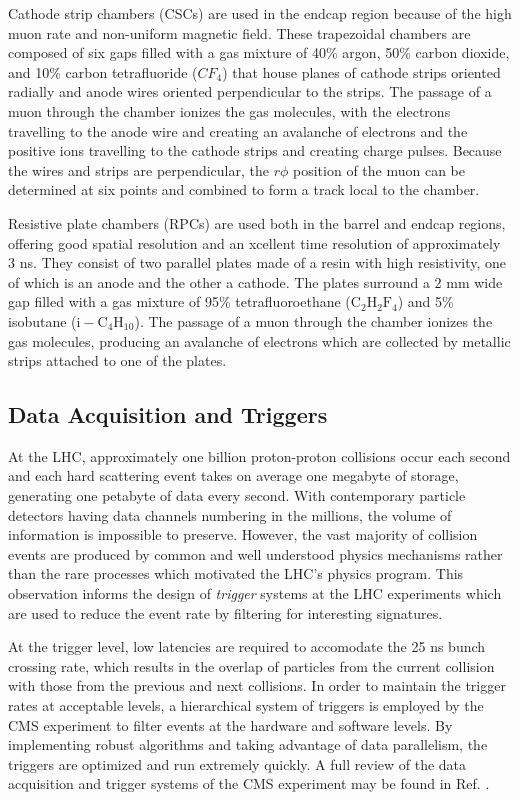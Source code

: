 Cathode strip chambers (CSCs) are used in the endcap region because of the high muon rate and non-uniform magnetic field. These trapezoidal chambers are composed of six gaps filled with a gas mixture of 40\% argon, 50\% carbon dioxide, and 10\% carbon tetrafluoride ($CF_{4}$) that house planes of cathode strips oriented radially and anode wires oriented perpendicular to the strips. The passage of a muon through the chamber ionizes the gas molecules, with the electrons travelling to the anode wire and creating an avalanche of electrons and the positive ions travelling to the cathode strips and creating charge pulses. Because the wires and strips are perpendicular, the $r\phi$ position of the muon can be determined at six points and combined to form a track local to the chamber.

Resistive plate chambers (RPCs) are used both in the barrel and endcap regions, offering good spatial resolution and an xcellent time resolution of approximately 3 ns. They consist of two parallel plates made of a resin with high resistivity, one of which is an anode and the other a cathode. The plates surround a 2 mm wide gap filled with a gas mixture of 95\% tetrafluoroethane ($\mathrm{C_{2}H_{2}F_{4}}$) and 5\% isobutane ($\mathrm{i-C_{4}H_{10}}$). The passage of a muon through the chamber ionizes the gas molecules, producing an avalanche of electrons which are collected by metallic strips attached to one of the plates.

\subsection{Data Acquisition and Triggers}

At the LHC, approximately one billion proton-proton collisions occur each second and each hard scattering event takes on average one megabyte of storage, generating one petabyte of data every second. With contemporary particle detectors having data channels numbering in the millions, the volume of information is impossible to preserve. However, the vast majority of collision events are produced by common and well understood physics mechanisms rather than the rare processes which motivated the LHC's physics program. This observation informs the design of \textit{trigger} systems at the LHC experiments which are used to reduce the event rate by filtering for interesting signatures.

At the trigger level, low latencies are required to accomodate the 25 ns bunch crossing rate, which results in the overlap of particles from the current collision with those from the previous and next collisions. In order to maintain the trigger rates at acceptable levels, a hierarchical system of triggers is employed by the CMS experiment to filter events at the hardware and software levels. By implementing robust algorithms and taking advantage of data parallelism, the triggers are optimized and run extremely quickly. A full review of the data acquisition and trigger systems of the CMS experiment may be found in Ref. \cite{CMSTRIDAS}.

